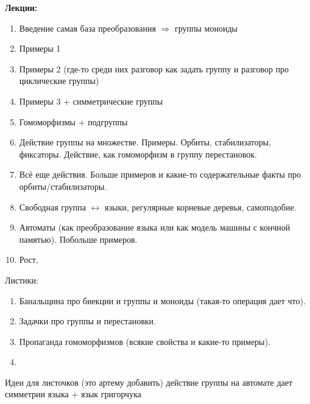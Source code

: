 	\noindent\bf{Лекции:}
	\begin{enumerate}
		\item Введение самая база преобразования $\Rightarrow$ группы моноиды 
		\item Примеры 1 
		\item Примеры 2 (где-то среди них разговор как задать группу и разговор про циклические группы)
		\item Примеры 3 + симметрические группы
		\item Гомоморфизмы + подгруппы
		\item Действие группы на множестве. Примеры. Орбиты, стабилизаторы, фиксаторы. Действие, как гомоморфизм в группу перестановок. 
		\item Всё еще действия. Больше примеров и какие-то содержательные факты про орбиты/стабилизаторы. 
		\item Свободная группа $\leftrightarrow$ языки, регулярные корневые деревья, самоподобие. 
		\item Автоматы (как преобразование языка или как модель машины с кончной памятью). Побольше примеров. 
		\item Рост,  %

	\end{enumerate}

	Листики: 
	\begin{enumerate}
		\item Банальщина про биекции и группы и моноиды (такая-то операция дает что).
		\item Задачки про группы и перестановки.
		\item Пропаганда гомоморфизмов (всякие свойства и какие-то примеры).
		\item 

	\end{enumerate}
	Идеи для листочков (это артему добавить) действие группы на автомате дает симметрии языка + язык григорчука




